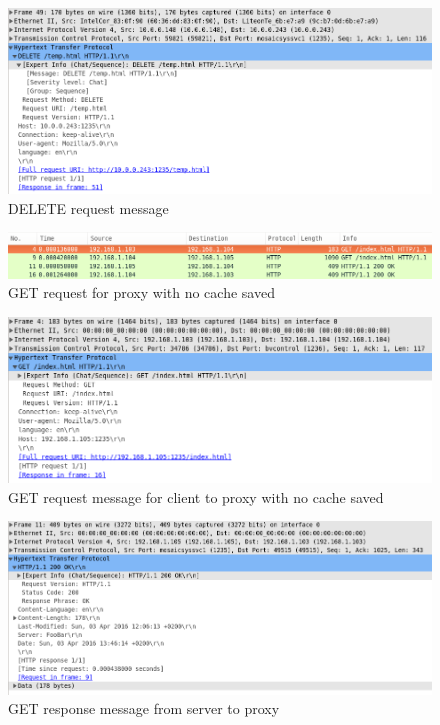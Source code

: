 \documentclass[10pt,twocolumn]{witseiepaper}
\begin{document}
		\begin{figure}[h!]
			\centering
			\includegraphics[width=\columnwidth]{resources/delete_request_message}
			\caption{DELETE request message}
			\label{fig:basic_delete_message}
		\end{figure}
		
		\begin{figure}[h!]
			\centering
			\includegraphics[width=\columnwidth]{resources/proxy_new}
			\caption{GET request for proxy with no cache saved}
			\label{fig:proxy_new}
		\end{figure}
		
		\begin{figure}[h!]
			\centering
			\includegraphics[width=\columnwidth]{resources/proxy_new_client}
			\caption{GET request message for client to proxy with no cache saved}
			\label{fig:proxy_new_client}
		\end{figure}
		
		\begin{figure}[h!]
			\centering
			\includegraphics[width=\columnwidth]{resources/proxy_server}
			\caption{GET response message from server to proxy}
			\label{fig:proxy_server}
		\end{figure}
		
\end{document}
